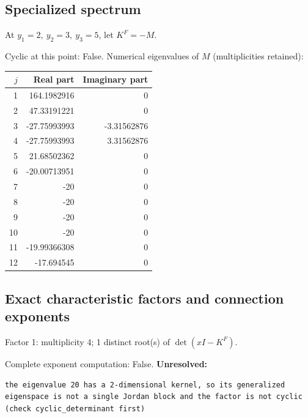 \documentclass[10pt,a4paper]{article}
\newcommand{\fitmath}[1]{\sbox{\mathbox}{$\displaystyle #1$}\ifdim\wd\mathbox>\linewidth\resizebox{\linewidth}{!}{\usebox{\mathbox}}\else\usebox{\mathbox}\fi}
\begin{document}
\subsection*{Specialized spectrum}
At $y_1=2,\ y_2=3,\ y_3=5$, let $K^F=-M$.
\begin{center}\fitmath{\Delta=0}\end{center}
Cyclic at this point: False.
Numerical eigenvalues of $M$ (multiplicities retained):
\begin{center}\small\begin{tabular}{rrr}\toprule $j$ & Real part & Imaginary part\\\midrule
1 & 164.1982916 & 0\\
2 & 47.33191221 & 0\\
3 & -27.75993993 & -3.31562876\\
4 & -27.75993993 & 3.31562876\\
5 & 21.68502362 & 0\\
6 & -20.00713951 & 0\\
7 & -20 & 0\\
8 & -20 & 0\\
9 & -20 & 0\\
10 & -20 & 0\\
11 & -19.99366308 & 0\\
12 & -17.694545 & 0\\
\bottomrule\end{tabular}\end{center}
\subsection*{Exact characteristic factors and connection exponents}
Factor 1: multiplicity 4; 1 distinct root(s) of $\det(xI-K^F)$.
\begin{center}\fitmath{\begin{aligned}p_{1}(x)&=x - 20\end{aligned}}\end{center}
Complete exponent computation: False.
\textbf{Unresolved:}

\begin{lstlisting}
the eigenvalue 20 has a 2-dimensional kernel, so its generalized eigenspace is not a single Jordan block and the factor is not cyclic (check cyclic_determinant first)
\end{lstlisting}
\end{document}
